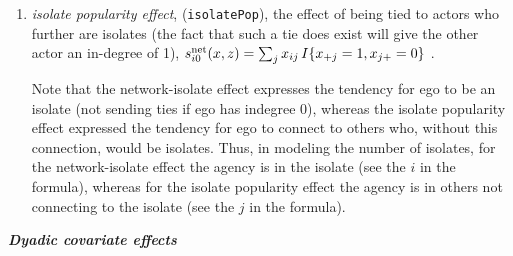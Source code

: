 \documentclass[a4paper,fleqn,11pt]{article}
\newcommand{\+}{\, + \,}
\newcommand{\vit}{\theenumi}
\newcounter{savenumi}
\begin{document}
\begin{enumerate}
\item \emph{isolate popularity effect}, (\texttt{isolatePop}), the effect of
      being tied to actors who further are isolates
      (the fact that such a tie does exist will give the other actor
      an in-degree of 1),
$s^{\rm net}_{i\vit}(x, z) = \sum_j x_{ij}\, I\{x_{+j} = 1, x_{j+} = 0 \} $ .

      Note that the network-isolate effect expresses the tendency for ego
      to be an isolate (not sending ties if ego has indegree 0),
      whereas the isolate popularity effect expressed the tendency for ego
      to connect to others who, without this connection, would be isolates.
      Thus, in modeling the number of isolates, for the network-isolate
      effect the agency is in the isolate (see the $i$ in the formula),
      whereas for the isolate popularity effect the agency is in others not
      connecting to the isolate (see the $j$ in the formula).

\setcounter{savenumi}{\value{enumi}}
\end{enumerate}
\medskip

\noindent
\textbf{\emph{Dyadic covariate effects}}
\medskip
\end{document}
